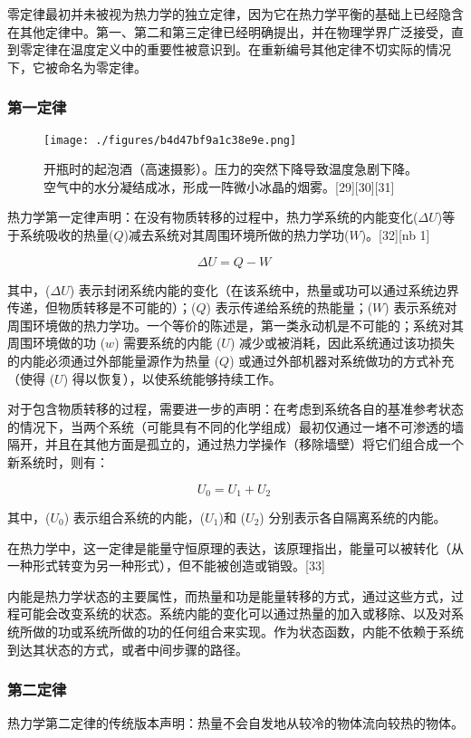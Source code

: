 零定律最初并未被视为热力学的独立定律，因为它在热力学平衡的基础上已经隐含在其他定律中。第一、第二和第三定律已经明确提出，并在物理学界广泛接受，直到零定律在温度定义中的重要性被意识到。在重新编号其他定律不切实际的情况下，它被命名为零定律。
\subsubsection{第一定律}
\begin{figure}[ht]
\centering
\texttt{[image: ./figures/b4d47bf9a1c38e9e.png]}
\caption{开瓶时的起泡酒（高速摄影）。压力的突然下降导致温度急剧下降。空气中的水分凝结成冰，形成一阵微小冰晶的烟雾。[29][30][31]} \label{fig_RLX_3}
\end{figure}
热力学第一定律声明：在没有物质转移的过程中，热力学系统的内能变化(\(\Delta U\))等于系统吸收的热量(\(Q\))减去系统对其周围环境所做的热力学功(\(W\))。[32][nb 1]

\[
\Delta U = Q - W~
\]

其中，(\(\Delta U\)) 表示封闭系统内能的变化（在该系统中，热量或功可以通过系统边界传递，但物质转移是不可能的）；(\(Q\)) 表示传递给系统的热能量；(\(W\)) 表示系统对周围环境做的热力学功。一个等价的陈述是，第一类永动机是不可能的；系统对其周围环境做的功 (\(w\)) 需要系统的内能 (\( U\)) 减少或被消耗，因此系统通过该功损失的内能必须通过外部能量源作为热量 (\( Q\)) 或通过外部机器对系统做功的方式补充（使得 (\( U\)) 得以恢复），以使系统能够持续工作。

对于包含物质转移的过程，需要进一步的声明：在考虑到系统各自的基准参考状态的情况下，当两个系统（可能具有不同的化学组成）最初仅通过一堵不可渗透的墙隔开，并且在其他方面是孤立的，通过热力学操作（移除墙壁）将它们组合成一个新系统时，则有：

\[
U_0 = U_1 + U_2~
\]

其中，(\( U_0\)) 表示组合系统的内能，(\( U_1\))和 (\( U_2\)) 分别表示各自隔离系统的内能。

在热力学中，这一定律是能量守恒原理的表达，该原理指出，能量可以被转化（从一种形式转变为另一种形式），但不能被创造或销毁。[33]

内能是热力学状态的主要属性，而热量和功是能量转移的方式，通过这些方式，过程可能会改变系统的状态。系统内能的变化可以通过热量的加入或移除、以及对系统所做的功或系统所做的功的任何组合来实现。作为状态函数，内能不依赖于系统到达其状态的方式，或者中间步骤的路径。
\subsubsection{第二定律}  
热力学第二定律的传统版本声明：热量不会自发地从较冷的物体流向较热的物体。

